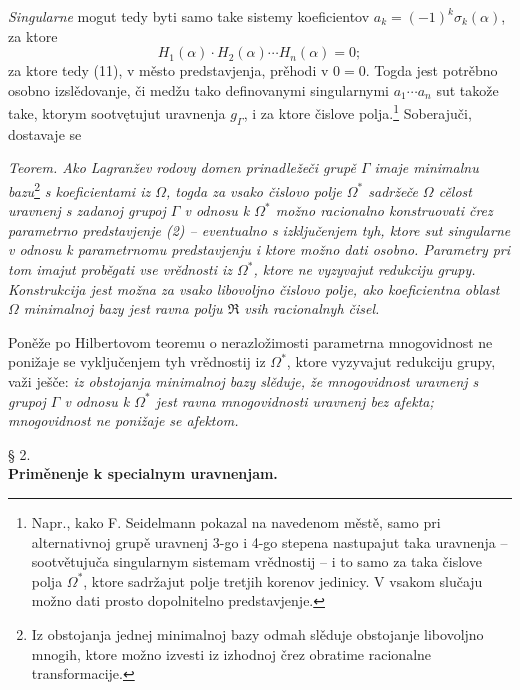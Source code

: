 \documentclass[11pt]{article}
\begin{document}
{\itshape Singularne} mogut tedy byti samo take sistemy koeficientov $a_k=(-1)^k\sigma_k(\alpha)$, za ktore
\[
H_1(\alpha)\cdot H_2(\alpha)\cdots H_n(\alpha)=0;
\]
za ktore tedy (11), v město predstavjenja, prěhodi v $0=0$. Togda jest potrěbno osobno izslědovanje, či medžu tako definovanymi singularnymi $a_1\cdots a_n$ sut takože take, ktorym sootvętujut uravnenja $g_\Gamma$, i za ktore čislove polja.\footnote{Napr., kako F. Seidelmann pokazal na navedenom městě, samo pri alternativnoj grupě uravnenj 3-go i 4-go stepena nastupajut taka uravnenja -- sootvětujuča singularnym sistemam vrědnostij -- i to samo za taka čislove polja $\Omega^*$, ktore sadržajut polje tretjih korenov jedinicy. V vsakom slučaju možno dati prosto dopolnitelno predstavjenje.} Soberajuči, dostavaje se

{\itshape Teorem. Ako Lagranžev rodovy domen prinadležeči grupě $\Gamma$ imaje minimalnu bazu}\footnote{Iz obstojanja jednej minimalnoj bazy odmah slěduje obstojanje libovoljno mnogih, ktore možno izvesti iz izhodnoj črez obratime racionalne transformacije.} {\itshape s koeficientami iz $\Omega$, togda za vsako čislovo polje $\Omega^*$ sadržeče $\Omega$ cělost uravnenj s zadanoj grupoj $\Gamma$ v odnosu k $\Omega^*$ možno racionalno konstruovati črez parametrno predstavjenje (2) -- eventualno s izključenjem tyh, ktore sut singularne v odnosu k parametrnomu predstavjenju i ktore možno dati osobno. Parametry pri tom imajut proběgati vse vrědnosti iz $\Omega^*$, ktore ne vyzyvajut redukciju grupy. Konstrukcija jest možna za vsako libovoljno čislovo polje, ako koeficientna oblast $\Omega$ minimalnoj bazy jest ravna polju $\mathfrak R$ vsih racionalnyh čisel.}

Poněže po Hilbertovom teoremu o nerazložimosti parametrna mnogovidnost ne ponižaje se vyključenjem tyh vrědnostij iz $\Omega^*$, ktore vyzyvajut redukciju grupy, važi ješče: {\itshape iz obstojanja minimalnoj bazy slěduje, že mnogovidnost uravnenj s grupoj $\Gamma$ v odnosu k $\Omega^*$ jest ravna mnogovidnosti uravnenj bez afekta; mnogovidnost ne ponižaje se afektom.}

\begin{center}
§ 2.\\[0.75\baselineskip]
\textbf{Priměnenje k specialnym uravnenjam.}
\end{center}
\end{document}
